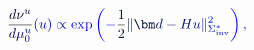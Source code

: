 \documentclass[12pt]{article}
\begin{document}
\makeatletter
\renewcommand*{\@textcolor}[3]{%
  \protect\leavevmode
  \begingroup
    \color#1{#2}#3%
  \endgroup
}
\makeatother
\begin{displaymath}
\mathcolor[RGB]{0,0,15}{\frac { \mathcolor[RGB]{0,0,30}{d} \mathcolor[RGB]{0,0,45}{\nu} ^ { \mathcolor[RGB]{0,0,60}{u} } } { \mathcolor[RGB]{0,0,75}{d} \mathcolor[RGB]{0,0,90}{\mu} _ { \mathcolor[RGB]{0,0,105}{0} } ^ { \mathcolor[RGB]{0,0,120}{u} } } } \mathcolor[RGB]{0,0,135}{(} \mathcolor[RGB]{0,0,150}{u} \mathcolor[RGB]{0,0,165}{)} \mathcolor[RGB]{0,0,180}{\propto} \mathrm { \mathcolor[RGB]{0,0,195}{e} \mathcolor[RGB]{0,0,210}{x} \mathcolor[RGB]{0,0,225}{p} } \mathcolor[RGB]{0,0,240}{\left(} \mathcolor[RGB]{0,0,255}{-} \mathcolor[RGB]{0,15,0}{\frac { \mathcolor[RGB]{0,15,15}{1} } { \mathcolor[RGB]{0,15,30}{2} } } \mathcolor[RGB]{0,15,45}{\|} \mathcolor[RGB]{0,15,60}{\bm} { \mathcolor[RGB]{0,15,75}{d} } \mathcolor[RGB]{0,15,90}{-} \mathcolor[RGB]{0,15,105}{H} \mathcolor[RGB]{0,15,120}{u} \mathcolor[RGB]{0,15,135}{\|} _ { \mathcolor[RGB]{0,15,150}{\Sigma} _ { \mathrm { \mathcolor[RGB]{0,15,165}{i} \mathcolor[RGB]{0,15,180}{n} \mathcolor[RGB]{0,15,195}{v} } } ^ { \mathcolor[RGB]{0,15,210}{*} } } ^ { \mathcolor[RGB]{0,15,225}{2} } \mathcolor[RGB]{0,15,240}{\right)} \mathcolor[RGB]{0,15,255}{,}
\end{displaymath}
\end{document}
